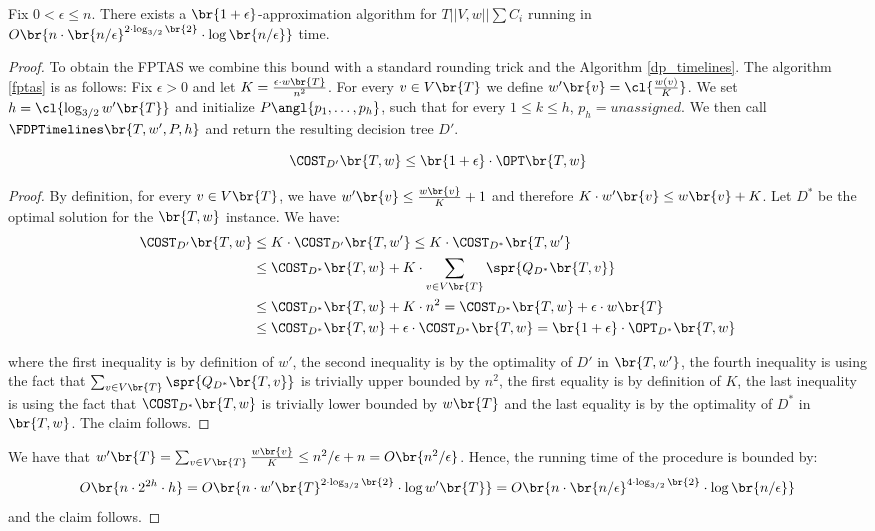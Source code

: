 \begin{theorem}
Fix $0<\epsilon\leq n$. There exists a $\br{1+\epsilon}$-approximation algorithm for $T||V,w||\sum C_i$ running in $O\br{n\cdot \br{n/\epsilon}^{2\cdot\log_{3/2}\br{2}}\cdot\log\br{n/\epsilon}}$ time. 
\begin{proof}
    
To obtain the FPTAS we combine this bound with a standard rounding trick and the Algorithm \ref{dp_timelines}. The algorithm \ref{fptas} is as follows: Fix $\epsilon>0$ and let $K=\frac{\epsilon\cdot w\br{T}}{n^2}$. For every $v\in V\br{T}$ we define $w'\br{v}=\cl{\frac{w(v)}{K}}$. We set $h = \cl{\log_{3/2}w'\br{T}}$ and initialize $P\angl{p_1,\dots,p_h}$, such that for every $1\leq k\leq h$, $p_h= \textit{unassigned}$. We then call $\FDPTimelines\br{T, w', P, h}
$ and return the resulting decision tree $D'$.

\begin{lemma}
    $$
    \COST_{D'}\br{T, w}\leq \br{1+\epsilon}\cdot \OPT\br{T,w}
    $$
    \begin{proof}
        By definition, for every $v\in V\br{T}$, we have $w'\br{v}\leq \frac{w\br{v}}{K}+1$ and therefore $K\cdot w'\br{v}\leq w\br{v}+K$. Let $D^*$ be the optimal solution for the $\br{T,w}$ instance. We have:
        \begin{align*}
        \COST_{D'}\br{T, w}&\leq K\cdot \COST_{D'}\br{T, w'}\leq K\cdot \COST_{D^*}\br{T, w'}
        \\&\leq
        \COST_{D^*}\br{T, w}+K\cdot\sum_{v\in V\br{T}}\spr{Q_{D^*}\br{T,v}}
        \\
        &\leq 
        \COST_{D^*}\br{T, w} + K\cdot n^2 = \COST_{D^*}\br{T, w} +\epsilon\cdot w\br{T} \\&\leq
        \COST_{D^*}\br{T, w}+\epsilon\cdot \COST_{D^*}\br{T, w} = \br{1+\epsilon}\cdot\OPT_{D^*}\br{T, w}
        \end{align*}

        where the first inequality is by definition of $w'$, the second inequality is by the optimality of $D'$ in $\br{T,w'}$, the fourth inequality is using the fact that $\sum_{v\in V\br{T}}\spr{Q_{D^*}\br{T,v}}$ is trivially upper bounded by $n^2$, the first equality is by definition of $K$, the last inequality is using the fact that $\COST_{D^*}\br{T, w}$ is trivially lower bounded by $w\br{T}$ and the last equality is by the optimality of $D^*$ in $\br{T,w}$. The claim follows.
    \end{proof}
\end{lemma}

    We have that $w'\br{T}=\sum_{v\in V\br{T}}\frac{w\br{v}}{K}\leq n^2/\epsilon+n=O\br{n^2/\epsilon}$.
    Hence, the running time of the procedure is bounded by: 
    $$O\br{n\cdot 2^{2h}\cdot h}=O\br{n\cdot w'\br{T}^{2\cdot\log_{3/2}\br{2}}\cdot \log w'\br{T}}=O\br{n\cdot \br{n/\epsilon}^{4\cdot\log_{3/2}\br{2}}\cdot\log\br{n/\epsilon}}$$ and the claim follows.
\end{proof}
\end{theorem}


